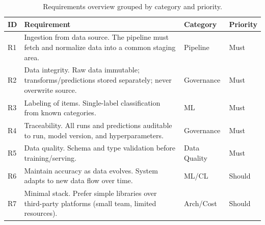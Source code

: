 \begin{table}[htbp]
    \centering
    \begin{tabularx}{\linewidth}{@{}lXll@{}}
        \toprule
        \textbf{ID} & \textbf{Requirement}                                                                                  & \textbf{Category} & \textbf{Priority} \\
        \midrule
        R1          & Ingestion from data source. The pipeline must fetch and normalize data into a common staging area.    & Pipeline          & Must              \\
        R2          & Data integrity. Raw data immutable; transforms/predictions stored separately; never overwrite source. & Governance        & Must              \\
        R3          & Labeling of items. Single-label classification from known categories.                                 & ML                & Must              \\
        R4          & Traceability. All runs and predictions auditable to run, model version, and hyperparameters.          & Governance        & Must              \\
        R5          & Data quality. Schema and type validation before training/serving.                                     & Data Quality      & Must              \\
        R6          & Maintain accuracy as data evolves. System adapts to new data flow over time.                          & ML/CL             & Should            \\
        R7          & Minimal stack. Prefer simple libraries over third-party platforms (small team, limited resources).    & Arch/Cost         & Should            \\
        \bottomrule
    \end{tabularx}
    \caption{Requirements overview grouped by category and priority.}
    \label{tab:req_overview}
\end{table}
